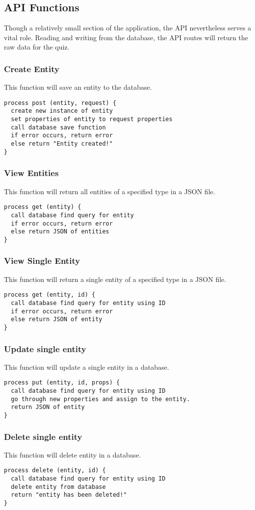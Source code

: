 \subsection{API Functions}
Though a relatively small section of the application, the API nevertheless serves a vital role. Reading and writing from the database, the API routes will return the raw data for the quiz.

\subsubsection{Create Entity}
This function will save an entity to the database.
\begin{verbatim}
process post (entity, request) {
  create new instance of entity
  set properties of entity to request properties
  call database save function
  if error occurs, return error
  else return "Entity created!"
}
\end{verbatim}

\subsubsection{View Entities}
This function will return all entities of a specified type in a JSON file.
\begin{verbatim}
process get (entity) {
  call database find query for entity
  if error occurs, return error
  else return JSON of entities
}
\end{verbatim}

\subsubsection{View Single Entity}
This function will return a single entity of a specified type in a JSON file.
\begin{verbatim}
process get (entity, id) {
  call database find query for entity using ID
  if error occurs, return error
  else return JSON of entity
}
\end{verbatim}

\subsubsection{Update single entity}
This function will update a single entity in a database.
\begin{verbatim}
process put (entity, id, props) {
  call database find query for entity using ID
  go through new properties and assign to the entity.
  return JSON of entity
}
\end{verbatim}

\subsubsection{Delete single entity}
This function will delete entity in a database.
\begin{verbatim}
process delete (entity, id) {
  call database find query for entity using ID
  delete entity from database
  return "entity has been deleted!"
}
\end{verbatim}

